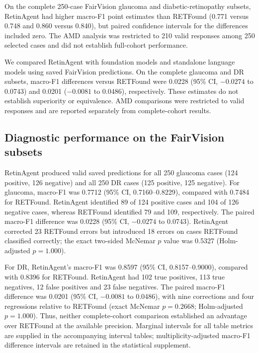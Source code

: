 
On the complete 250-case FairVision glaucoma and diabetic-retinopathy subsets,
RetinAgent had higher macro-F1 point estimates than RETFound (0.771 versus
0.748 and 0.860 versus 0.840), but paired confidence intervals for the
differences included zero. The AMD analysis was restricted to 210 valid
responses among 250 selected cases and did not establish full-cohort performance.

We compared RetinAgent with foundation models and standalone language models
using saved FairVision predictions. On the complete glaucoma and DR subsets,
macro-F1 differences versus RETFound were 0.0228 (95\% CI, $-0.0274$ to
0.0743) and 0.0201 ($-0.0081$ to 0.0486), respectively. These estimates do
not establish superiority or equivalence. AMD comparisons were restricted
to valid responses and are reported separately from complete-cohort results.

\subsection{Diagnostic performance on the FairVision subsets}
RetinAgent produced valid saved predictions for all 250 glaucoma cases
(124 positive, 126 negative) and all 250 DR cases (125 positive, 125 negative).
For glaucoma, macro-F1 was 0.7712 (95\% CI, 0.7160--0.8229), compared with
0.7484 for RETFound. RetinAgent identified 89 of 124 positive cases and
104 of 126 negative cases, whereas RETFound identified 79 and 109,
respectively. The paired macro-F1 difference was 0.0228 (95\% CI,
$-0.0274$ to 0.0743). RetinAgent corrected 23 RETFound errors but introduced
18 errors on cases RETFound classified correctly; the exact two-sided
McNemar $p$ value was 0.5327 (Holm-adjusted $p=1.000$).

For DR, RetinAgent's macro-F1 was 0.8597 (95\% CI, 0.8157--0.9000),
compared with 0.8396 for RETFound. RetinAgent had 102 true positives,
113 true negatives, 12 false positives and 23 false negatives. The paired
macro-F1 difference was 0.0201 (95\% CI, $-0.0081$ to 0.0486), with nine
corrections and four regressions relative to RETFound (exact McNemar
$p=0.2668$; Holm-adjusted $p=1.000$). Thus, neither complete-cohort
comparison established an advantage over RETFound at the available precision.
Marginal intervals for all table metrics are supplied in the accompanying
interval tables; multiplicity-adjusted macro-F1 difference intervals are
retained in the statistical supplement.

